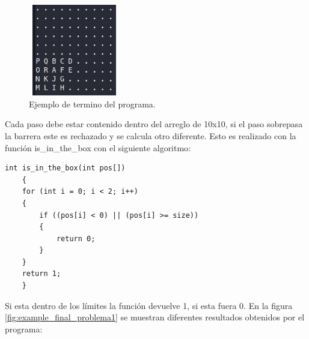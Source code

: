\begin{center}
\begin{minipage}{0.48\linewidth}
\begin{figure}[H]
            \includegraphics[width=4cm,height=4cm]{Graphics/example_3_2_problem1.png}
            \caption{Ejemplo de termino del programa.}
            \label{fig:example_block}
        \end{figure}
    \end{minipage}
\end{center}

Cada paso debe estar contenido dentro del arreglo de 10x10, si el paso sobrepasa la barrera este es rechazado y se calcula otro diferente. Esto es realizado con la función \textcolor{citecolor}{is\_in\_the\_box} con el siguiente algoritmo:

\begin{lstlisting}[style=CStyle]
    int is_in_the_box(int pos[])
    {
    for (int i = 0; i < 2; i++)
    {
        if ((pos[i] < 0) || (pos[i] >= size))
        {
            return 0;
        }
    }
    return 1;
    }
\end{lstlisting}
Si esta dentro de los límites la función devuelve 1, si esta fuera 0. En la figura \ref{fig:example_final_problema1} se muestran diferentes resultados obtenidos por el programa:

